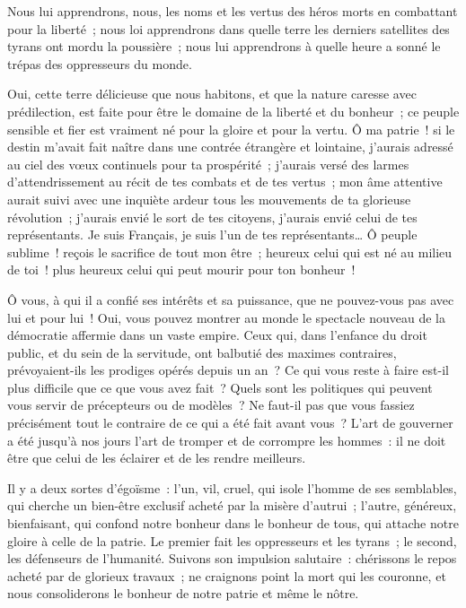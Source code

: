 \documentclass[french,twoside]{book} %
\begin{document}
Nous lui apprendrons, nous, les noms et les vertus des héros morts en combattant pour la liberté ; nous loi apprendrons dans quelle terre les derniers satellites des tyrans ont mordu la poussière ; nous lui apprendrons à quelle heure a sonné le trépas des oppresseurs du monde.\par
Oui, cette terre délicieuse que nous habitons, et que la nature caresse avec prédilection, est faite pour être le domaine de la liberté et du bonheur ; ce peuple sensible et fier est vraiment né pour la gloire et pour la vertu. Ô ma patrie ! si le destin m’avait fait naître dans une contrée étrangère et lointaine, j’aurais adressé au ciel des vœux continuels pour ta prospérité ; j’aurais versé des larmes d’attendrissement au récit de tes combats et de tes vertus ; mon âme attentive aurait suivi avec une inquiète ardeur tous les mouvements de ta glorieuse révolution ; j’aurais envié le sort de tes citoyens, j’aurais envié celui de tes représentants. Je suis Français, je suis l’un de tes représentants… Ô peuple sublime ! reçois le sacrifice de tout mon être ; heureux celui qui est né au milieu de toi ! plus heureux celui qui peut mourir pour ton bonheur !\par
Ô vous, à qui il a confié ses intérêts et sa puissance, que ne pouvez-vous pas avec lui et pour lui ! Oui, vous pouvez montrer au monde le spectacle nouveau de la démocratie affermie dans un vaste empire. Ceux qui, dans l’enfance du droit public, et du sein de la servitude, ont balbutié des maximes contraires, prévoyaient-ils les prodiges opérés depuis un an ? Ce qui vous reste à faire est-il plus difficile que ce que vous avez fait ? Quels sont les politiques qui peuvent vous servir de précepteurs ou de modèles ? Ne faut-il pas que vous fassiez précisément tout le contraire de ce qui a été fait avant vous ? L’art de gouverner a été jusqu’à nos jours l’art de tromper et de corrompre les hommes : il ne doit être que celui de les éclairer et de les rendre meilleurs.\par
Il y a deux sortes d’égoïsme : l’un, vil, cruel, qui isole l’homme de ses semblables, qui cherche un bien-être exclusif acheté par la misère d’autrui ; l’autre, généreux, bienfaisant, qui confond notre bonheur dans le bonheur de tous, qui attache notre gloire à celle de la patrie. Le premier fait les oppresseurs et les tyrans ; le second, les défenseurs de l’humanité. Suivons son impulsion salutaire : chérissons le repos acheté par de glorieux travaux ; ne craignons point la mort qui les couronne, et nous consoliderons le bonheur de notre patrie et même le nôtre.\par
\end{document}
